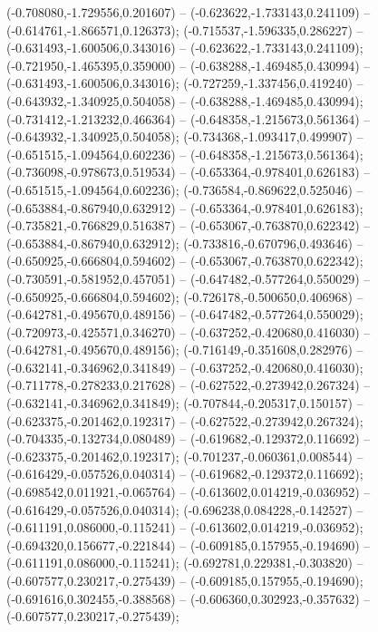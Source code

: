  (-0.708080,-1.729556,0.201607) -- (-0.623622,-1.733143,0.241109) -- (-0.614761,-1.866571,0.126373);
 (-0.715537,-1.596335,0.286227) -- (-0.631493,-1.600506,0.343016) -- (-0.623622,-1.733143,0.241109);
 (-0.721950,-1.465395,0.359000) -- (-0.638288,-1.469485,0.430994) -- (-0.631493,-1.600506,0.343016);
 (-0.727259,-1.337456,0.419240) -- (-0.643932,-1.340925,0.504058) -- (-0.638288,-1.469485,0.430994);
 (-0.731412,-1.213232,0.466364) -- (-0.648358,-1.215673,0.561364) -- (-0.643932,-1.340925,0.504058);
 (-0.734368,-1.093417,0.499907) -- (-0.651515,-1.094564,0.602236) -- (-0.648358,-1.215673,0.561364);
 (-0.736098,-0.978673,0.519534) -- (-0.653364,-0.978401,0.626183) -- (-0.651515,-1.094564,0.602236);
 (-0.736584,-0.869622,0.525046) -- (-0.653884,-0.867940,0.632912) -- (-0.653364,-0.978401,0.626183);
 (-0.735821,-0.766829,0.516387) -- (-0.653067,-0.763870,0.622342) -- (-0.653884,-0.867940,0.632912);
 (-0.733816,-0.670796,0.493646) -- (-0.650925,-0.666804,0.594602) -- (-0.653067,-0.763870,0.622342);
 (-0.730591,-0.581952,0.457051) -- (-0.647482,-0.577264,0.550029) -- (-0.650925,-0.666804,0.594602);
 (-0.726178,-0.500650,0.406968) -- (-0.642781,-0.495670,0.489156) -- (-0.647482,-0.577264,0.550029);
 (-0.720973,-0.425571,0.346270) -- (-0.637252,-0.420680,0.416030) -- (-0.642781,-0.495670,0.489156);
 (-0.716149,-0.351608,0.282976) -- (-0.632141,-0.346962,0.341849) -- (-0.637252,-0.420680,0.416030);
 (-0.711778,-0.278233,0.217628) -- (-0.627522,-0.273942,0.267324) -- (-0.632141,-0.346962,0.341849);
 (-0.707844,-0.205317,0.150157) -- (-0.623375,-0.201462,0.192317) -- (-0.627522,-0.273942,0.267324);
 (-0.704335,-0.132734,0.080489) -- (-0.619682,-0.129372,0.116692) -- (-0.623375,-0.201462,0.192317);
 (-0.701237,-0.060361,0.008544) -- (-0.616429,-0.057526,0.040314) -- (-0.619682,-0.129372,0.116692);
 (-0.698542,0.011921,-0.065764) -- (-0.613602,0.014219,-0.036952) -- (-0.616429,-0.057526,0.040314);
 (-0.696238,0.084228,-0.142527) -- (-0.611191,0.086000,-0.115241) -- (-0.613602,0.014219,-0.036952);
 (-0.694320,0.156677,-0.221844) -- (-0.609185,0.157955,-0.194690) -- (-0.611191,0.086000,-0.115241);
 (-0.692781,0.229381,-0.303820) -- (-0.607577,0.230217,-0.275439) -- (-0.609185,0.157955,-0.194690);
 (-0.691616,0.302455,-0.388568) -- (-0.606360,0.302923,-0.357632) -- (-0.607577,0.230217,-0.275439);
